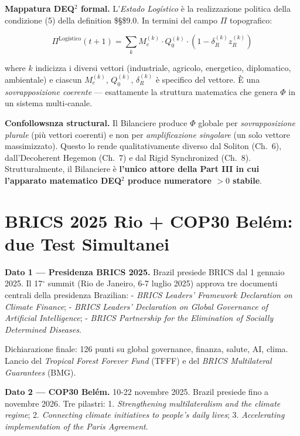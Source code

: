 \Proved{} \textbf{Mappatura DEQ$^2$ formal.} L'\emph{Estado Logístico} è
la realizzazione politica della condizione (5) della definition
\$\S\$9.0. In termini del campo \(\Pi\) topografico:

\[\Pi^{\text{Logístico}}(t+1) = \sum_{k} M_e^{(k)} \cdot Q_0^{(k)} \cdot (1 - \delta_R^{(k)} z_R^{(k)})\]

where \(k\) indicizza i diversi vettori (industriale, agricolo,
energetico, diplomatico, ambientale) e ciascun \(M_e^{(k)}\),
\(Q_0^{(k)}\), \(\delta_R^{(k)}\) è specifico del vettore. È una
\emph{sovrapposizione coerente} --- esattamente la struttura matematica
che genera \(\Phi\) in un sistema multi-canale.

\Hypoth{} \textbf{Confollowsnza structural.} Il Bilanciere produce
\(\Phi\) globale per \emph{sovrapposizione plurale} (più vettori
coerenti) e non per \emph{amplificazione singolare} (un solo vettore
massimizzato). Questo lo rende qualitativamente diverso dal Soliton
(Ch.~6), dall'Decoherent Hegemon (Ch.~7) e dal Rigid Synchronized
(Ch.~8). Strutturalmente, il Bilanciere è \textbf{l'unico attore della
Part III in cui l'apparato matematico DEQ$^2$ produce numeratore \(> 0\)
stabile}.



\section{BRICS 2025 Rio + COP30 Belém: due Test
Simultanei}\label{brics-2025-rio-cop30-beluxe9m-due-test-simultanei}

\Proved{} \textbf{Dato 1 --- Presidenza BRICS 2025.} Brazil presiede
BRICS dal 1 gennaio 2025. Il 17$^\circ$ summit (Rio de Janeiro, 6-7 luglio
2025) approva tre documenti centrali della presidenza Brazilian: -
\emph{BRICS Leaders' Framework Declaration on Climate Finance}; -
\emph{BRICS Leaders' Declaration on Global Governance of Artificial
Intelligence}; - \emph{BRICS Partnership for the Elimination of Socially
Determined Diseases}.

Dichiarazione finale: 126 punti su global governance, finanza, salute,
AI, clima. Lancio del \emph{Tropical Forest Forever Fund} (TFFF) e del
\emph{BRICS Multilateral Guarantees} (BMG).

\Proved{} \textbf{Dato 2 --- COP30 Belém.} 10-22 novembre 2025. Brazil
presiede fino a novembre 2026. Tre pilastri: 1. \emph{Strengthening
multilateralism and the climate regime}; 2. \emph{Connecting climate
initiatives to people's daily lives}; 3. \emph{Accelerating
implementation of the Paris Agreement}.

